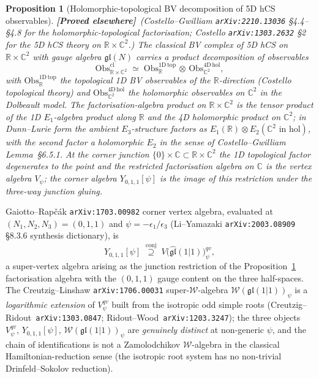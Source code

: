 \documentclass[11pt]{amsart}
\newtheorem{proposition}[theorem]{Proposition}
\theoremstyle{definition}
\providecommand{\cW}{\mathcal{W}}
\providecommand{\R}{\mathbb{R}}
\providecommand{\C}{\mathbb{C}}
\providecommand{\fgl}{\mathfrak{gl}}
\providecommand{\ClaimStatusProvedElsewhere}{\textbf{\textsf{[Proved elsewhere]}}}
\begin{document}
\begin{proposition}[Holomorphic-topological BV decomposition of 5D hCS observables]
\label{prop:hol-top-decomp}
\ClaimStatusProvedElsewhere\ (Costello--Gwilliam \texttt{arXiv:2210.13036}
\S4.4--\S4.8 for the holomorphic-topological factorisation; Costello
\texttt{arXiv:1303.2632} \S2 for the 5D hCS theory on $\R\times\C^2$.)
The classical BV complex of 5D hCS on $\R\times\C^2$ with gauge algebra
$\fgl(N)$ carries a product decomposition of observables
\[
  \mathrm{Obs}^{\mathrm{cl}}_{\R\times\C^2}
  \;\simeq\;
  \mathrm{Obs}^{\mathrm{1D\,top}}_{\R}
  \,\otimes\,
  \mathrm{Obs}^{\mathrm{4D\,hol}}_{\C^2},
\]
with $\mathrm{Obs}^{\mathrm{1D\,top}}_{\R}$ the topological 1D BV observables
of the $\R$-direction (Costello topological theory) and
$\mathrm{Obs}^{\mathrm{4D\,hol}}_{\C^2}$ the holomorphic observables on
$\C^2$ in the Dolbeault model. The factorisation-algebra product on
$\R\times\C^2$ is the tensor product of the 1D $E_1$-algebra product along
$\R$ and the 4D holomorphic product on $\C^2$; in Dunn--Lurie form the
ambient $E_3$-structure factors as $E_1(\R)\otimes E_2(\C^2 \text{ in hol})$,
with the second factor a \emph{holomorphic} $E_2$ in the sense of
Costello--Gwilliam Lemma~\S6.5.1. At the corner junction $\{0\}\times\C
\subset \R\times\C^2$ the 1D topological factor degenerates to the point
and the restricted factorisation algebra on $\C$ is the \emph{vertex
algebra} $V_\psi$; the corner algebra $Y_{0,1,1}[\psi]$ is the image of
this restriction under the three-way junction gluing.
\end{proposition}

Gaiotto--Rapčák \texttt{arXiv:1703.00982} corner vertex algebra, evaluated
at $(N_1, N_2, N_3) = (0, 1, 1)$ and $\psi = -\epsilon_1/\epsilon_3$
(Li--Yamazaki \texttt{arXiv:2003.08909} §8.3.6 synthesis dictionary), is
\[
  Y_{0,1,1}[\psi]
  \;\stackrel{\mathrm{conj}}{\supseteq}\;
  V\bigl(\widehat{\fgl}(1|1)\bigr)^{qv}_\psi,
\]
a super-vertex algebra arising as the junction restriction of the
Proposition~\ref{prop:hol-top-decomp} factorisation algebra with the
$(0,1,1)$ gauge content on the three half-spaces. The Creutzig--Linshaw
\texttt{arXiv:1706.00031} super-$\cW$-algebra $\cW(\fgl(1|1))_\psi$
is a \emph{logarithmic extension} of $V^{qv}_\psi$ built from the
isotropic odd simple roots (Creutzig--Ridout~\texttt{arXiv:1303.0847};
Ridout--Wood~\texttt{arXiv:1203.3247}); the three objects
$V^{qv}_\psi$, $Y_{0,1,1}[\psi]$, $\cW(\fgl(1|1))_\psi$ are
\emph{genuinely distinct} at non-generic $\psi$, and the chain of
identifications is not a Zamolodchikov $\cW$-algebra in the classical
Hamiltonian-reduction sense (the isotropic root system has no non-trivial
Drinfeld--Sokolov reduction).
\end{document}
